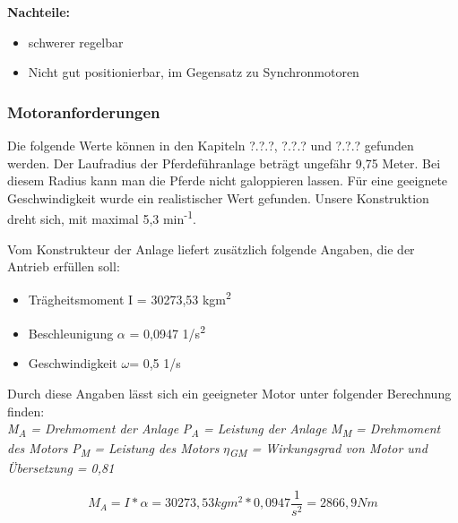 \textbf{Nachteile:}

\begin{itemize}
	\item{schwerer regelbar}
	\item{Nicht gut positionierbar, im Gegensatz zu Synchronmotoren}
\end{itemize}

\subsubsection{Motoranforderungen}
\label{sec:motoranforderungen}

Die folgende Werte können in den Kapiteln ?.?.?, ?.?.? und ?.?.? gefunden werden. 
Der Laufradius der Pferdeführanlage beträgt ungefähr 9,75 Meter. Bei diesem Radius kann man die Pferde nicht galoppieren lassen. 
Für eine geeignete Geschwindigkeit wurde ein realistischer Wert gefunden. %
Unsere Konstruktion dreht sich, mit maximal 5,3 min\textsuperscript{-1}. 

Vom Konstrukteur der Anlage liefert zusätzlich folgende Angaben, die der Antrieb erfüllen soll:
\\

\begin{itemize}
	\item{Trägheitsmoment I = 30273,53 kgm\textsuperscript{2}}
	\item{Beschleunigung $\alpha$ = 0,0947 1/s\textsuperscript{2}}
	\item{Geschwindigkeit $\omega$= 0,5 1/s}
\end{itemize}

Durch diese Angaben lässt sich ein geeigneter Motor unter folgender Berechnung finden:
\\
\textit{M\textsubscript{A} = Drehmoment der Anlage} \newline
\textit{P\textsubscript{A} = Leistung der Anlage} \newline
\textit{M\textsubscript{M} = Drehmoment des Motors} \newline
\textit{P\textsubscript{M} = Leistung des Motors} \newline
\textit{$\eta$\textsubscript{GM} = Wirkungsgrad von Motor und Übersetzung = 0,81}

\newpage


\begin{center}
\begin{equation}
  \label{eq:2}
	M_{A} = I * \alpha = 30273,53kgm^2 * 0,0947 \dfrac{1}{s^2} = 2866,9 Nm
\end{equation} 
\end{center}


